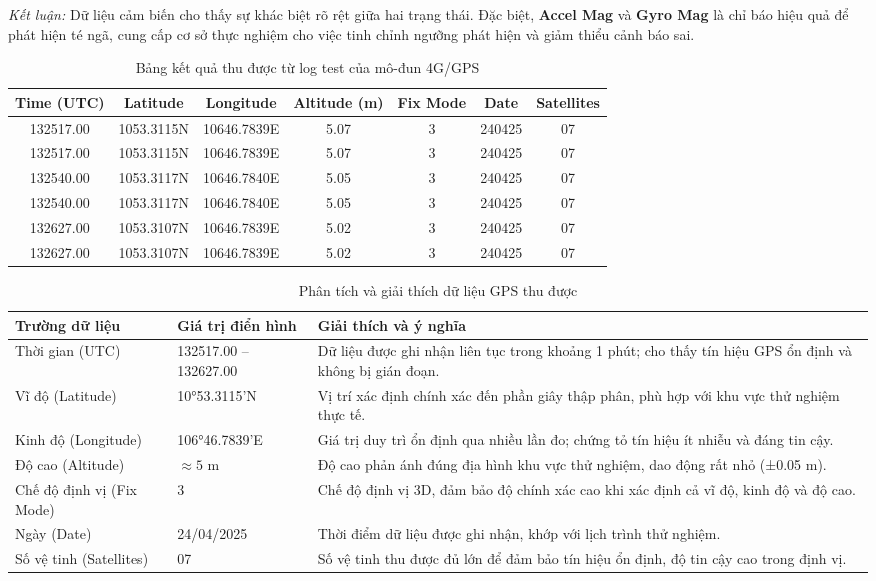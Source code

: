 \textit{Kết luận:} Dữ liệu cảm biến cho thấy sự khác biệt rõ rệt giữa hai trạng thái. Đặc biệt, \textbf{Accel Mag} và \textbf{Gyro Mag} là chỉ báo hiệu quả để phát hiện té ngã, cung cấp cơ sở thực nghiệm cho việc tinh chỉnh ngưỡng phát hiện và giảm thiểu cảnh báo sai.

\begin{table}[H]
\centering
\caption{Bảng kết quả thu được từ log test của mô-đun 4G/GPS}
\label{tab:gps_data}
\begin{tabular}{|c|c|c|c|c|c|c|}
\hline
\textbf{Time (UTC)} & \textbf{Latitude} & \textbf{Longitude} & \textbf{Altitude (m)} & \textbf{Fix Mode} & \textbf{Date} & \textbf{Satellites} \\
\hline
132517.00 & 1053.3115N & 10646.7839E & 5.07 & 3 & 240425 & 07 \\
132517.00 & 1053.3115N & 10646.7839E & 5.07 & 3 & 240425 & 07 \\
132540.00 & 1053.3117N & 10646.7840E & 5.05 & 3 & 240425 & 07 \\
132540.00 & 1053.3117N & 10646.7840E & 5.05 & 3 & 240425 & 07 \\
132627.00 & 1053.3107N & 10646.7839E & 5.02 & 3 & 240425 & 07 \\
132627.00 & 1053.3107N & 10646.7839E & 5.02 & 3 & 240425 & 07 \\
\hline
\end{tabular}
\end{table}



\begin{table}[H]
\centering
\caption{Phân tích và giải thích dữ liệu GPS thu được}
\label{tab:gps_analysis}
\renewcommand{\arraystretch}{1.3}
\begin{tabularx}{\textwidth}{|p{3cm}|p{3cm}|X|}
\hline
\textbf{Trường dữ liệu} & \textbf{Giá trị điển hình} & \textbf{Giải thích và ý nghĩa} \\
\hline
Thời gian (UTC) & 132517.00 -- 132627.00 & Dữ liệu được ghi nhận liên tục trong khoảng 1 phút; cho thấy tín hiệu GPS ổn định và không bị gián đoạn. \\
\hline
Vĩ độ (Latitude) & 10°53.3115'N & Vị trí xác định chính xác đến phần giây thập phân, phù hợp với khu vực thử nghiệm thực tế. \\
\hline
Kinh độ (Longitude) & 106°46.7839'E & Giá trị duy trì ổn định qua nhiều lần đo; chứng tỏ tín hiệu ít nhiễu và đáng tin cậy. \\
\hline
Độ cao (Altitude) & $\approx 5$ m & Độ cao phản ánh đúng địa hình khu vực thử nghiệm, dao động rất nhỏ (±0.05 m). \\
\hline
Chế độ định vị (Fix Mode) & 3 & Chế độ định vị 3D, đảm bảo độ chính xác cao khi xác định cả vĩ độ, kinh độ và độ cao. \\
\hline
Ngày (Date) & 24/04/2025 & Thời điểm dữ liệu được ghi nhận, khớp với lịch trình thử nghiệm. \\
\hline
Số vệ tinh (Satellites) & 07 & Số vệ tinh thu được đủ lớn để đảm bảo tín hiệu ổn định, độ tin cậy cao trong định vị. \\
\hline
\end{tabularx}
\end{table}
